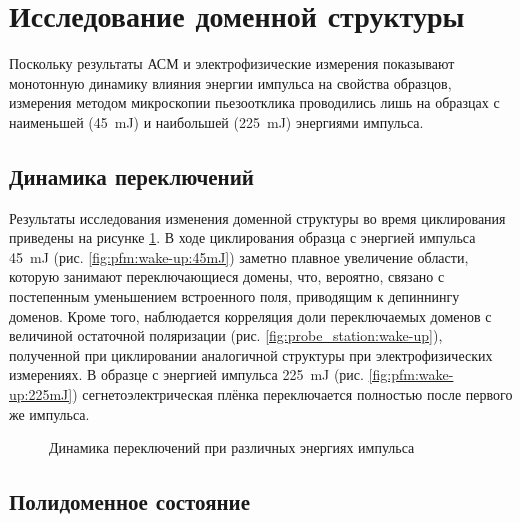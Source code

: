 \section{Исследование доменной структуры}

Поскольку результаты АСМ и электрофизические измерения показывают монотонную динамику влияния энергии импульса на свойства образцов, измерения методом микроскопии пьезоотклика проводились лишь на образцах с наименьшей (\SI{45}{\milli\joule}) и наибольшей (\SI{225}{\milli\joule}) энергиями импульса.

\subsection{Динамика переключений}

Результаты исследования изменения доменной структуры во время циклирования приведены на рисунке \cref{fig:pfm:wake-up}. В ходе циклирования образца с энергией импульса \SI{45}{\milli\joule} (рис. \cref{fig:pfm:wake-up:45mJ}) заметно плавное увеличение области, которую занимают переключающиеся домены, что, вероятно, связано с постепенным уменьшением встроенного поля, приводящим к депиннингу доменов. Кроме того, наблюдается корреляция доли переключаемых доменов с величиной остаточной поляризации (рис. \cref{fig:probe_station:wake-up}), полученной при циклировании аналогичной структуры при электрофизических измерениях. В образце с энергией импульса \SI{225}{\milli\joule} (рис. \cref{fig:pfm:wake-up:225mJ}) сегнетоэлектрическая плёнка переключается полностью после первого же импульса.

\begin{figure}[ht]
    \caption[Этот текст попадает в названия рисунков в списке рисунков]{Динамика переключений при различных энергиях импульса}\label{fig:pfm:wake-up}
\end{figure}

\subsection{Полидоменное состояние}

